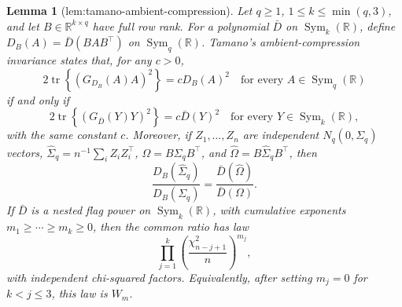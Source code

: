 \documentclass{article}
\newtheorem{lemma}{Lemma}
\begin{document}
\begin{lemma}[lem:tamano-ambient-compression]\label{lem:tamano-ambient-compression}
Let \(q\geq1\), \(1\leq k\leq\min(q,3)\), and let
\(B\in\mathbb R^{k\times q}\) have full row rank.  For a polynomial
\(\bar D\) on \(\operatorname{Sym}_k(\mathbb R)\), define
\(D_B(A)=\bar D(BAB^{\top})\) on
\(\operatorname{Sym}_q(\mathbb R)\).  Tamano's ambient-compression
invariance states that, for any \(c>0\),
\[
 2\operatorname{tr}\!\left\{(G_{D_B}(A)A)^2\right\}=cD_B(A)^2
 \quad\text{for every }A\in\operatorname{Sym}_q(\mathbb R)
\]
if and only if
\[
 2\operatorname{tr}\!\left\{(G_{\bar D}(Y)Y)^2\right\}=c\bar D(Y)^2
 \quad\text{for every }Y\in\operatorname{Sym}_k(\mathbb R),
\]
with the same constant \(c\).  Moreover, if
\(Z_1,\ldots,Z_n\) are independent \(N_q(0,\Sigma_q)\) vectors,
\(\widehat\Sigma_q=n^{-1}\sum_i Z_iZ_i^{\top}\),
\(\Omega=B\Sigma_qB^{\top}\), and
\(\widehat\Omega=B\widehat\Sigma_qB^{\top}\), then
\[
 \frac{D_B(\widehat\Sigma_q)}{D_B(\Sigma_q)}
 =\frac{\bar D(\widehat\Omega)}{\bar D(\Omega)}.
\]
If \(\bar D\) is a nested flag power on
\(\operatorname{Sym}_k(\mathbb R)\), with cumulative exponents
\(m_1\geq\cdots\geq m_k\geq0\), then the common ratio has law
\[
 \prod_{j=1}^{k}
 \left(\frac{\chi^2_{n-j+1}}{n}\right)^{m_j},
\]
with independent chi-squared factors.  Equivalently, after setting
\(m_j=0\) for \(k<j\leq3\), this law is \(W_m\).
\end{lemma}
\end{document}
